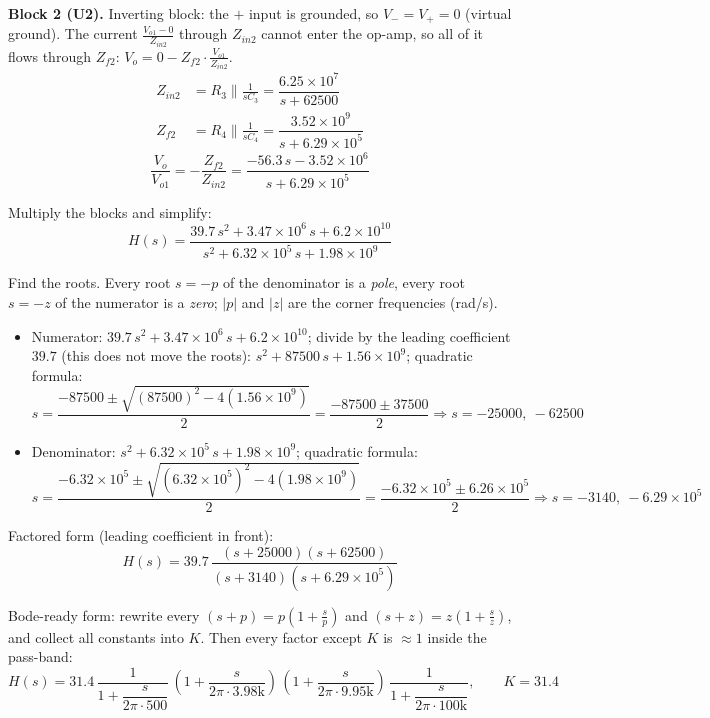 \documentclass[11pt]{article}
\newcommand{\solstep}[2]{\par\medskip{\color{stepc}\textbf{Step #1 --- #2}}\par\nopagebreak}
\begin{document}
\textbf{Block 2 (U2).} Inverting block: the $+$ input is grounded, so $V_- = V_+ = 0$ (virtual ground). The current $\frac{V_{o1} - 0}{Z_{in2}}$ through $Z_{in2}$ cannot enter the op-amp, so all of it flows through $Z_{f2}$: $V_{o} = 0 - Z_{f2}\cdot\frac{V_{o1}}{Z_{in2}}$.\begin{align*}
Z_{in2} &= R_{3} \parallel \frac{1}{sC_{3}} = \dfrac{6.25\times 10^{7}}{s + 62500} \\
Z_{f2} &= R_{4} \parallel \frac{1}{sC_{4}} = \dfrac{3.52\times 10^{9}}{s + 6.29\times 10^{5}}
\end{align*}
\[
\frac{V_{o}}{V_{o1}} = -\frac{Z_{f2}}{Z_{in2}} = \dfrac{-56.3\,s - 3.52\times 10^{6}}{s + 6.29\times 10^{5}}
\]

Multiply the blocks and simplify:\[
H(s) = \dfrac{39.7\,s^{2} + 3.47\times 10^{6}\,s + 6.2\times 10^{10}}{s^{2} + 6.32\times 10^{5}\,s + 1.98\times 10^{9}}
\]

\solstep{5}{Standard (Bode-ready) form}Find the roots. Every root $s=-p$ of the denominator is a \emph{pole}, every root $s=-z$ of the numerator is a \emph{zero}; $|p|$ and $|z|$ are the corner frequencies (rad/s).
\begin{itemize}[leftmargin=*,itemsep=2pt]
\item Numerator: $39.7\,s^{2} + 3.47\times 10^{6}\,s + 6.2\times 10^{10}$; divide by the leading coefficient $39.7$ (this does not move the roots): $s^{2} + 87500\,s + 1.56\times 10^{9}$; quadratic formula:\[
s = \frac{-87500 \pm \sqrt{(87500)^2 - 4(1.56\times 10^{9})}}{2} = \frac{-87500 \pm 37500}{2} \Rightarrow s = -25000,\ -62500
\]

\item Denominator: $s^{2} + 6.32\times 10^{5}\,s + 1.98\times 10^{9}$; quadratic formula:\[
s = \frac{-6.32\times 10^{5} \pm \sqrt{(6.32\times 10^{5})^2 - 4(1.98\times 10^{9})}}{2} = \frac{-6.32\times 10^{5} \pm 6.26\times 10^{5}}{2} \Rightarrow s = -3140,\ -6.29\times 10^{5}
\]

\end{itemize}

Factored form (leading coefficient in front):
\[
H(s) = 39.7\,\dfrac{(s+25000)(s+62500)}{(s+3140)(s+6.29\times 10^{5})}
\]

Bode-ready form: rewrite every $(s+p) = p\left(1+\frac{s}{p}\right)$ and $(s+z) = z\left(1+\frac{s}{z}\right)$, and collect all constants into $K$. Then every factor except $K$ is $\approx 1$ inside the pass-band:
\[
H(s) = 31.4\,\dfrac{1}{1+\dfrac{s}{2\pi\cdot 500}}\,\left(1+\dfrac{s}{2\pi\cdot 3.98\mathrm{k}}\right)\,\left(1+\dfrac{s}{2\pi\cdot 9.95\mathrm{k}}\right)\,\dfrac{1}{1+\dfrac{s}{2\pi\cdot 100\mathrm{k}}},\qquad K = 31.4
\]
\end{document}
